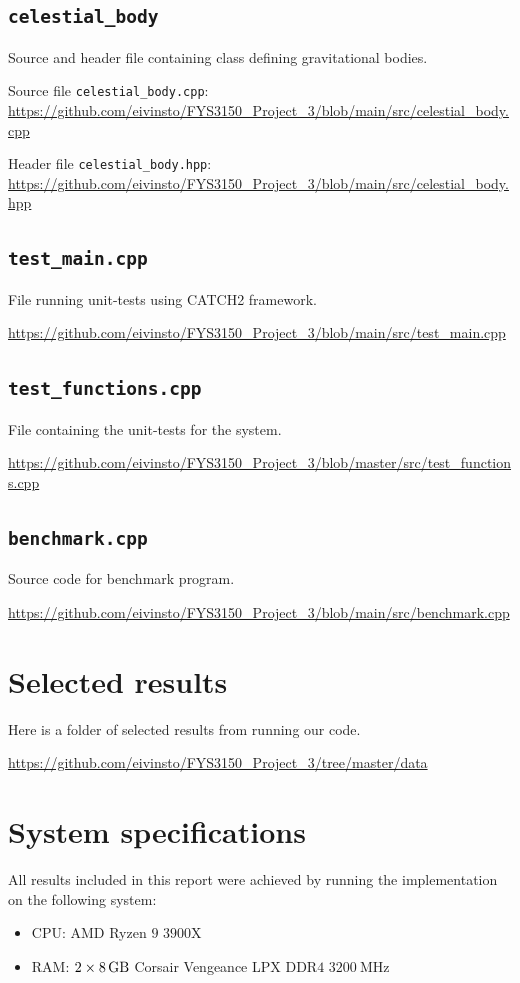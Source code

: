 \documentclass[reprint,english,notitlepage]{revtex4-1}  %
\begin{document}
\cprotect\subsection{\verb+celestial_body+} \label{A.5}
Source and header file containing class defining gravitational bodies.

Source file \verb+celestial_body.cpp+:
\url{https://github.com/eivinsto/FYS3150_Project_3/blob/main/src/celestial_body.cpp}

Header file \verb+celestial_body.hpp+:
\url{https://github.com/eivinsto/FYS3150_Project_3/blob/main/src/celestial_body.hpp}

\cprotect\subsection{\verb+test_main.cpp+} \label{A.6}
File running unit-tests using CATCH2 framework.

\url{https://github.com/eivinsto/FYS3150_Project_3/blob/main/src/test_main.cpp}

\cprotect\subsection{\verb+test_functions.cpp+} \label{A.7}
File containing the unit-tests for the system.

\url{https://github.com/eivinsto/FYS3150_Project_3/blob/master/src/test_functions.cpp}

\cprotect\subsection{\verb+benchmark.cpp+} \label{A.8}
Source code for benchmark program.

\url{https://github.com/eivinsto/FYS3150_Project_3/blob/main/src/benchmark.cpp}

\newpage
\section{Selected results} \label{B}
Here is a folder of selected results from running our code.

\url{https://github.com/eivinsto/FYS3150_Project_3/tree/master/data}

\newpage
\section{System specifications} \label{C}
All results included in this report were achieved by running the implementation on the following system:
\begin{itemize}
	\item CPU: AMD Ryzen \(9\) \(3900\)X
	\item RAM: \(2\times\SI{8}{\giga\byte}\) Corsair Vengeance LPX DDR\(4\) \(\SI{3200}{\mega\hertz}\)
\end{itemize}
\end{document}
